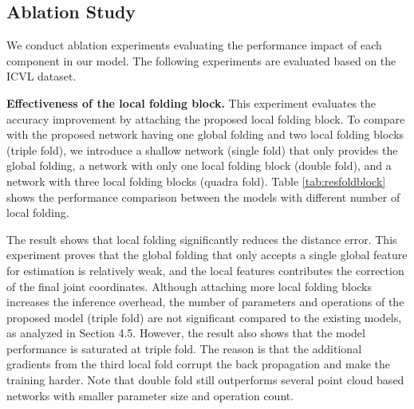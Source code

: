 \documentclass[10pt,twocolumn,letterpaper]{article}
\begin{document}
\subsection{Ablation Study}


We conduct ablation experiments evaluating the performance impact of each component in our model. The following experiments are evaluated based on the ICVL dataset.



\noindent
\textbf{Effectiveness of the local folding block.}
This experiment evaluates the accuracy improvement by attaching the proposed local folding block. To compare with the proposed network having one global folding and two local folding blocks (triple fold), we introduce a shallow network (single fold) that only provides the global folding, a network with only one local folding block (double fold), and a network with three local folding blocks (quadra fold). Table \ref{tab:resfoldblock} shows the performance comparison between the models with different number of local folding. 




The result shows that local folding significantly reduces the distance error. This experiment proves that the global folding that only accepts a single global feature for estimation is relatively weak, and the local features contributes the correction of the final joint coordinates. 
Although attaching more local folding blocks increases the inference overhead, the number of parameters and operations of the proposed model (triple fold) are not significant compared to the existing models, as analyzed in Section 4.5.
However, the result also shows that the model performance is saturated at triple fold. 
The reason is that the additional gradients from the third local fold corrupt the back propagation and make the training harder.
Note that double fold still outperforms several point cloud based networks with smaller parameter size and operation count. 
\end{document}
